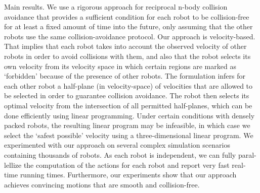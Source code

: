 \documentclass[12pt]{report}
\begin{document}
Main results. We use a rigorous approach for reciprocal n-body collision avoidance that provides a sufficient condition for each robot to be collision-free for at least a fixed amount of time into the future, only assuming that the other robots use the same collision-avoidance protocol. Our approach is velocity-based. That implies that each robot takes into account the observed velocity of other robots in order to avoid collisions with them, and also that the robot selects its own velocity from its velocity space in which certain regions are marked as ‘forbidden’ because of the presence of other robots. The formulation infers for each other robot a half-plane (in velocity-space) of velocities that are allowed to be selected in order to guarantee collision avoidance. The robot then selects its optimal velocity from the intersection of all permitted half-planes, which can be done efficiently using linear programming. Under certain conditions with densely packed robots, the resulting linear program may be infeasible, in which case we select the ‘safest possible’ velocity using a three-dimensional linear program.
We experimented with our approach on several complex simulation scenarios
containing thousands of robots. As each robot is independent, we can fully paral-
lellize the computation of the actions for each robot and report very fast real-time
running times. Furthermore, our experiments show that our approach achieves convincing motions that are smooth and collision-free.
\end{document}
